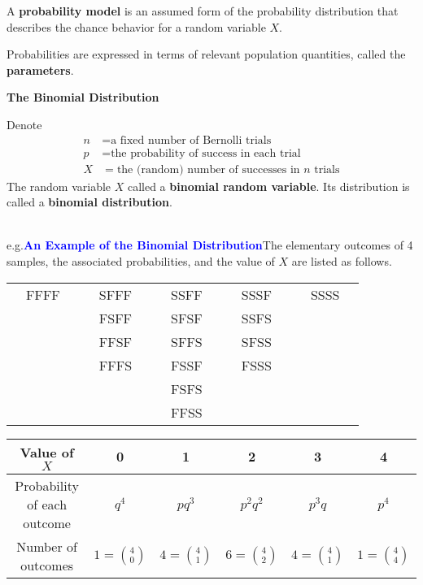 \documentclass[12pt,openany]{book}
\theoremstyle{definition}
\newcommand{\eg}{\textnormal{e.g.}}
\begin{document}
	\begin{tcolorbox}[colback=white]
		A \textbf{probability model} is an assumed form of the probability distribution that describes the chance behavior for a random variable $X$. \par
		Probabilities are expressed in terms of relevant population quantities, called the \textbf{parameters}.
	\end{tcolorbox}
	\begin{tcolorbox}[colback=white]
		\begin{center}	
			\textbf{The Binomial Distribution}\end{center}
		Denote \begin{align*}
		n &= \text{a fixed number of Bernolli trials} \\
		p &= \text{the probability of success in each trial} \\
		X &= \text{the (random) number of successes in $n$ trials}
		\end{align*} The random variable $X$ called a \textbf{binomial random variable}. Its distribution is called a \textbf{binomial distribution}.
	\end{tcolorbox}\ \\
	\eg\textcolor{blue}{\bf An Example of the Binomial Distribution}\quad The elementary outcomes of 4 samples, the associated probabilities, and the value of $X$ are listed as follows. \begin{center}
		\begin{tabular}{ccc ccc ccc ccc ccc}
			& FFFF &&& SFFF &&& SSFF &&& SSSF &&& SSSS & \\
			& 	   &&& FSFF &&& SFSF &&& SSFS &&& & \\
			& 	   &&& FFSF &&& SFFS &&& SFSS &&& & \\
			& 	   &&& FFFS &&& FSSF &&& FSSS &&& & \\
			& 	   &&&      &&& FSFS &&& &&& & \\
			& 	   &&&      &&& FFSS &&& &&& & \\
	\end{tabular}\end{center}
	\begin{center}\begin{tabular}{c||ccccc}
			\toprule[1.2pt]
			Value of $X$ & 0 & 1 & 2 & 3 & 4 \\
			\hline
			Probability of each outcome & $q^4$ & $pq^3$ & $p^2q^2$ & $p^3q$ & $p^4$ \\
			\hline
			Number of outcomes & $1=\binom{4}{0}$ & $4=\binom{4}{1}$ & $6=\binom{4}{2}$ & $4=\binom{4}{1}$ & $1=\binom{4}{4}$ \\
			\bottomrule[1.2pt] 
	\end{tabular}\end{center}
\end{document}
